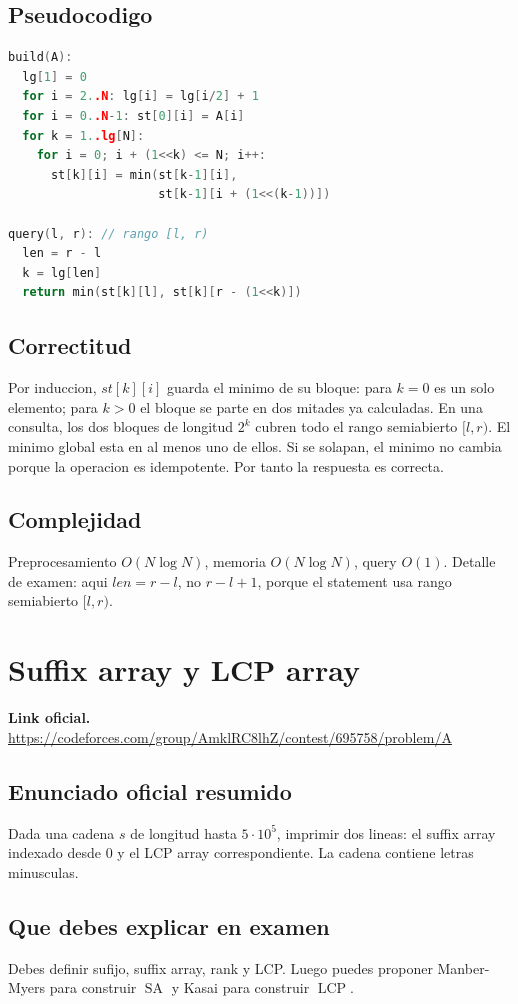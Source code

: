 \documentclass[10pt]{article}
\newcommand{\bigO}{O}
\newcommand{\SA}{\operatorname{SA}}
\newcommand{\LCP}{\operatorname{LCP}}
\begin{document}
\subsection{Pseudocodigo}
\begin{lstlisting}[language=C++]
build(A):
  lg[1] = 0
  for i = 2..N: lg[i] = lg[i/2] + 1
  for i = 0..N-1: st[0][i] = A[i]
  for k = 1..lg[N]:
    for i = 0; i + (1<<k) <= N; i++:
      st[k][i] = min(st[k-1][i],
                     st[k-1][i + (1<<(k-1))])

query(l, r): // rango [l, r)
  len = r - l
  k = lg[len]
  return min(st[k][l], st[k][r - (1<<k)])
\end{lstlisting}

\subsection{Correctitud}
Por induccion, $st[k][i]$ guarda el minimo de su bloque: para $k=0$ es un solo
elemento; para $k>0$ el bloque se parte en dos mitades ya calculadas. En una
consulta, los dos bloques de longitud $2^k$ cubren todo el rango semiabierto
$[l,r)$. El minimo global esta en al menos uno de ellos. Si se solapan, el
minimo no cambia porque la operacion es idempotente. Por tanto la respuesta es
correcta.

\subsection{Complejidad}
Preprocesamiento $\bigO(N\log N)$, memoria $\bigO(N\log N)$, query $\bigO(1)$.
Detalle de examen: aqui $len=r-l$, no $r-l+1$, porque el statement usa rango
semiabierto $[l,r)$.

\newpage

\section{Suffix array y LCP array}
\textbf{Link oficial.} \url{https://codeforces.com/group/AmklRC8lhZ/contest/695758/problem/A}

\subsection{Enunciado oficial resumido}
Dada una cadena $s$ de longitud hasta $5\cdot 10^5$, imprimir dos lineas:
el suffix array indexado desde $0$ y el LCP array correspondiente. La cadena
contiene letras minusculas.

\subsection{Que debes explicar en examen}
Debes definir sufijo, suffix array, rank y LCP. Luego puedes proponer
Manber-Myers para construir $\SA$ y Kasai para construir $\LCP$.
\end{document}
